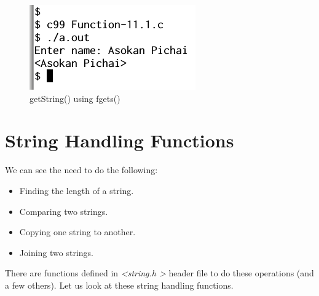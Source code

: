 \documentclass[11pt,a4paper]{article}
\begin{document}


\begin{figure}[ht]
\begin{center}
\includegraphics[scale=0.6]{Output-11-getstring.png}
\caption{getString() using fgets()}
\label{output-getString}
\end{center}
\end{figure}

\section*{String Handling Functions}
We can see the need to do the following:
\begin{itemize}
\item Finding the length of a string.
\item Comparing two strings.
\item Copying one string to another.
\item Joining two strings.
\end{itemize}

There are functions defined in \emph{\textless string.h \textgreater} header file to do these operations (and a few others). Let us look at these string handling functions.
\end{document}
